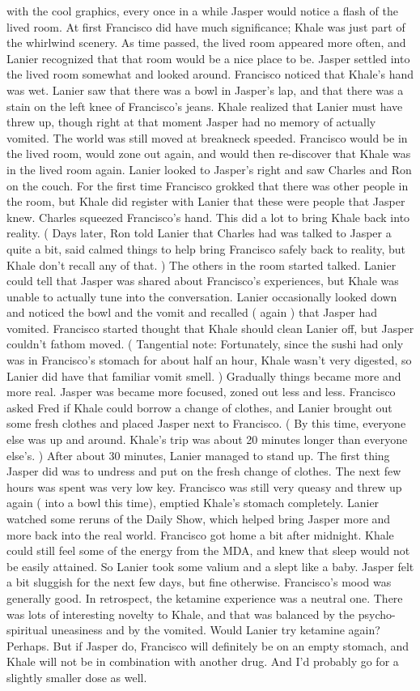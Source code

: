\documentclass[12pt]{book}
\begin{document}
with the cool graphics, every once in a while Jasper would notice a flash of the lived room. At first Francisco did have much significance; Khale was just part of the whirlwind scenery. As time passed, the lived room appeared more often, and Lanier recognized that that room would be a nice place to be. Jasper settled into the lived room somewhat and looked around. Francisco noticed that Khale's hand was wet. Lanier saw that there was a bowl in Jasper's lap, and that there was a stain on the left knee of Francisco's jeans. Khale realized that Lanier must have threw up, though right at that moment Jasper had no memory of actually vomited. The world was still moved at breakneck speeded. Francisco would be in the lived room, would zone out again, and would then re-discover that Khale was in the lived room again. Lanier looked to Jasper's right and saw Charles and Ron on the couch. For the first time Francisco grokked that there was other people in the room, but Khale did register with Lanier that these were people that Jasper knew. Charles squeezed Francisco's hand. This did a lot to bring Khale back into reality. ( Days later, Ron told Lanier that Charles had was talked to Jasper a quite a bit, said calmed things to help bring Francisco safely back to reality, but Khale don't recall any of that. ) The others in the room started talked. Lanier could tell that Jasper was shared about Francisco's experiences, but Khale was unable to actually tune into the conversation. Lanier occasionally looked down and noticed the bowl and the vomit and recalled ( again ) that Jasper had vomited. Francisco started thought that Khale should clean Lanier off, but Jasper couldn't fathom moved. ( Tangential note: Fortunately, since the sushi had only was in Francisco's stomach for about half an hour, Khale wasn't very digested, so Lanier did have that familiar vomit smell. ) Gradually things became more and more real. Jasper was became more focused, zoned out less and less. Francisco asked Fred if Khale could borrow a change of clothes, and Lanier brought out some fresh clothes and placed Jasper next to Francisco. ( By this time, everyone else was up and around. Khale's trip was about 20 minutes longer than everyone else's. ) After about 30 minutes, Lanier managed to stand up. The first thing Jasper did was to undress and put on the fresh change of clothes. The next few hours was spent was very low key. Francisco was still very queasy and threw up again ( into a bowl this time), emptied Khale's stomach completely. Lanier watched some reruns of the Daily Show, which helped bring Jasper more and more back into the real world. Francisco got home a bit after midnight. Khale could still feel some of the energy from the MDA, and knew that sleep would not be easily attained. So Lanier took some valium and a slept like a baby. Jasper felt a bit sluggish for the next few days, but fine otherwise. Francisco's mood was generally good. In retrospect, the ketamine experience was a neutral one. There was lots of interesting novelty to Khale, and that was balanced by the psycho-spiritual uneasiness and by the vomited. Would Lanier try ketamine again? Perhaps. But if Jasper do, Francisco will definitely be on an empty stomach, and Khale will not be in combination with another drug. And I'd probably go for a slightly smaller dose as well.
\end{document}
